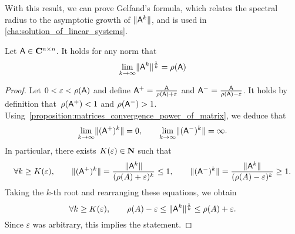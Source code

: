 With this result,
we can prove Gelfand's formula,
which relates the spectral radius to the asymptotic growth of $\lVert\mathsf A^k\rVert$,
and is used in \cref{cha:solution_of_linear_systems}.
\begin{proposition}
    \label{proposition:matrices_gelfands}
    Let $\mathsf A \in \mathbf C^{n \times n}$.
    It holds for any norm that
    \[
        \lim_{k \to \infty} \lVert\mathsf A^k\rVert^{\frac{1}{k}} = \rho(\mathsf A)
    \]
\end{proposition}
\begin{proof}
    Let $0 < \varepsilon < \rho(\mathsf A)$
    and define $\mathsf A^+ = \frac{\mathsf A}{\rho(\mathsf A) + \varepsilon}$ and $\mathsf A^- = \frac{\mathsf A}{\rho(\mathsf A) - \varepsilon}$.
    It holds by definition that~$\rho(\mathsf A^+) < 1$ and $\rho(\mathsf A^-) > 1$.
    Using~\cref{proposition:matrices_convergence_power_of_matrix}, we deduce that
    \[
        \lim_{k \to \infty} \lVert(\mathsf A^+)^k\rVert = 0, \qquad \lim_{k \to \infty} \lVert(\mathsf A^-)^k\rVert = \infty.
    \]
    In particular,
    there exists $K(\varepsilon) \in \mathbf N$ such that
    \[
        \forall k \geq K(\varepsilon), \qquad
        \lVert(\mathsf A^+)^k\rVert = \frac{\lVert\mathsf A^k\rVert}{(\rho(A) + \varepsilon)^k} \leq 1,
        \qquad \lVert(\mathsf A^-)^k\rVert = \frac{\lVert\mathsf A^k\rVert}{(\rho(A) - \varepsilon)^k}  \geq 1.
    \]
    Taking the $k$-th root and rearranging these equations,
    we obtain
    \[
        \forall k \geq K(\varepsilon), \qquad
        \rho(A) - \varepsilon \leq \lVert\mathsf A^k\rVert^{\frac{1}{k}} \leq \rho(A) + \varepsilon.
    \]
    Since $\varepsilon$ was arbitrary,
    this implies the statement.
\end{proof}
